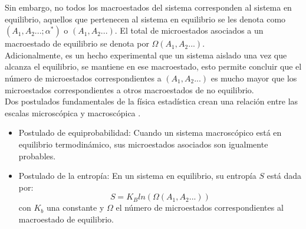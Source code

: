 Sin embargo, no todos los macroestados del sistema corresponden al sistema en equilibrio, aquellos que pertenecen al sistema en equilibrio se les denota como $(A_1, A_2...;\alpha^{*})$ o $(A_1, A_2...)$. El total de microestados asociados a un macroestado de equilibrio se denota por $\Omega(A_1, A_2...)$.\\


Adicionalmente, es un hecho experimental que un sistema aislado una vez que alcanza el equilibrio, se mantiene en ese macroestado, esto permite concluir que el número de microestados correspondientes a $(A_1, A_2...)$ es mucho mayor que los microestados correspondientes a otros macroestados de no equilibrio.\\


Dos postulados fundamentales de la física estadística crean una relación entre las escalas microscópica y macroscópica \cite{Huang_1987}\cite{tuckerman2010}.\\

\begin{itemize}
    \item Postulado de equiprobabilidad: Cuando un sistema macroscópico está en equilibrio termodinámico, sus microestados asociados son igualmente probables.\\
    
    \item Postulado de la entropía: En un sistema en equilibrio, su entropía $S$ está dada por:
    \begin{equation}\label{postulado_entropia_boltx}
        S=K_{B}ln(\Omega(A_1, A_2...))
    \end{equation}
    con $K_b$ una constante y $\Omega$ el número de microestados correspondientes al macroestado de equilibrio.
\end{itemize}

